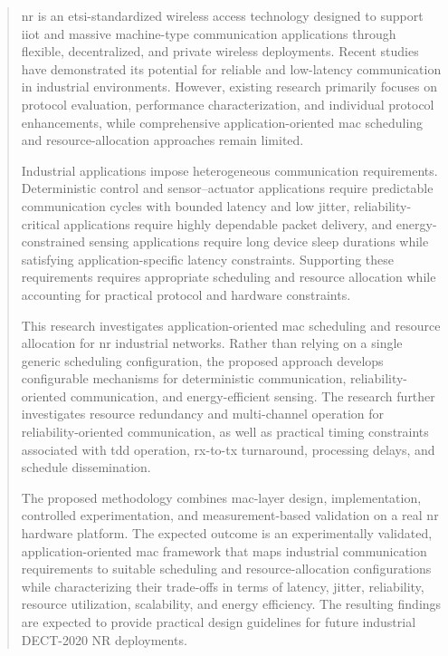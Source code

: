 \documentclass[12pt,a4paper]{article}
\begin{document}
\begin{abstract}

\gls{nr} is an \gls{etsi}-standardized wireless access technology designed to support \gls{iiot} and massive machine-type communication applications through flexible, decentralized, and private wireless deployments. Recent studies have demonstrated its potential for reliable and low-latency communication in industrial environments. However, existing research primarily focuses on protocol evaluation, performance characterization, and individual protocol enhancements, while comprehensive application-oriented \gls{mac} scheduling and resource-allocation approaches remain limited.

Industrial applications impose heterogeneous communication requirements. Deterministic control and sensor--actuator applications require predictable communication cycles with bounded latency and low jitter, reliability-critical applications require highly dependable packet delivery, and energy-constrained sensing applications require long device sleep durations while satisfying application-specific latency constraints. Supporting these requirements requires appropriate scheduling and resource allocation while accounting for practical protocol and hardware constraints.

This research investigates application-oriented \gls{mac} scheduling and resource allocation for \gls{nr} industrial networks. Rather than relying on a single generic scheduling configuration, the proposed approach develops configurable mechanisms for deterministic communication, reliability-oriented communication, and energy-efficient sensing. The research further investigates resource redundancy and multi-channel operation for reliability-oriented communication, as well as practical timing constraints associated with \gls{tdd} operation, \gls{rx}-to-\gls{tx} turnaround, processing delays, and schedule dissemination.

The proposed methodology combines \gls{mac}-layer design, implementation, controlled experimentation, and measurement-based validation on a real \gls{nr} hardware platform. The expected outcome is an experimentally validated, application-oriented \gls{mac} framework that maps industrial communication requirements to suitable scheduling and resource-allocation configurations while characterizing their trade-offs in terms of latency, jitter, reliability, resource utilization, scalability, and energy efficiency. The resulting findings are expected to provide practical design guidelines for future industrial DECT-2020 NR deployments.

\end{abstract}
\end{document}
